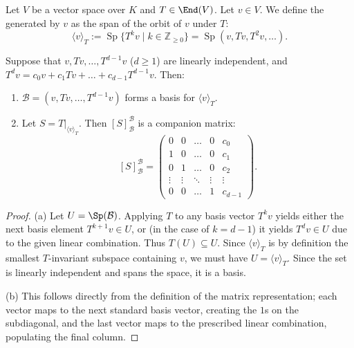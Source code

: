 \begin{definition}\label{def:T_cyclic_subspace}
  Let $V$ be a vector space over $K$ and $T \in \End(V)$. Let $v \in V$. We define the  generated by $v$ as the span of the orbit of $v$ under $T$:
  \[
  \langle v \rangle_T := \operatorname{Sp}\{T^k v \mid k \in \mathbb{Z}_{\ge 0}\} = \operatorname{Sp}(v, Tv, T^2v, \dots).
  \]
\end{definition}

\begin{lemma}\label{lemma:cyclic_basis_companion}
  Suppose that $v, Tv, \dots, T^{d-1}v$ ($d \ge 1$) are linearly independent, and $T^d v = c_0 v + c_1 Tv + \dots + c_{d-1}T^{d-1}v$. Then:
  \begin{enumerate}
    \item $\mathcal{B} = (v, Tv, \dots, T^{d-1}v)$ forms a basis for $\langle v \rangle_T$.
    \item Let $S = T|_{\langle v \rangle_T}$. Then $[S]_{\mathcal{B}}^{\mathcal{B}}$ is a companion matrix:
    \[
    [S]_{\mathcal{B}}^{\mathcal{B}} =
    \begin{pmatrix}
      0 & 0 & \dots & 0 & c_0 \\
      1 & 0 & \dots & 0 & c_1 \\
      0 & 1 & \dots & 0 & c_2 \\
      \vdots & \vdots & \ddots & \vdots & \vdots \\
      0 & 0 & \dots & 1 & c_{d-1}
    \end{pmatrix}.
    \]
  \end{enumerate}
\end{lemma}

\begin{proof}
  (a) Let $U = \Sp(\mathcal{B})$. Applying $T$ to any basis vector $T^k v$ yields either the next basis element $T^{k+1}v \in U$, or (in the case of $k=d-1$) it yields $T^d v \in U$ due to the given linear combination. Thus $T(U) \subseteq U$. Since $\langle v \rangle_T$ is by definition the smallest $T$-invariant subspace containing $v$, we must have $U = \langle v \rangle_T$. Since the set is linearly independent and spans the space, it is a basis.

  (b) This follows directly from the definition of the matrix representation; each vector maps to the next standard basis vector, creating the $1$s on the subdiagonal, and the last vector maps to the prescribed linear combination, populating the final column.
\end{proof}

